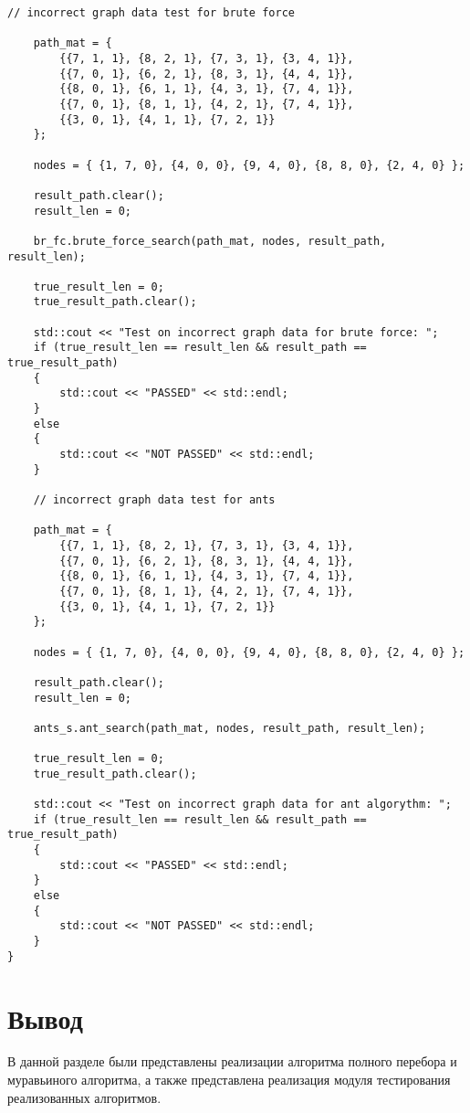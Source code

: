 \begin{lstlisting}[label=some-code-7,caption=Реализация тестов]
    // incorrect graph data test for brute force

    path_mat = {
        {{7, 1, 1}, {8, 2, 1}, {7, 3, 1}, {3, 4, 1}},
        {{7, 0, 1}, {6, 2, 1}, {8, 3, 1}, {4, 4, 1}},
        {{8, 0, 1}, {6, 1, 1}, {4, 3, 1}, {7, 4, 1}},
        {{7, 0, 1}, {8, 1, 1}, {4, 2, 1}, {7, 4, 1}},
        {{3, 0, 1}, {4, 1, 1}, {7, 2, 1}}
    };

    nodes = { {1, 7, 0}, {4, 0, 0}, {9, 4, 0}, {8, 8, 0}, {2, 4, 0} };

    result_path.clear();
    result_len = 0;

    br_fc.brute_force_search(path_mat, nodes, result_path, result_len);

    true_result_len = 0;
    true_result_path.clear();

    std::cout << "Test on incorrect graph data for brute force: ";
    if (true_result_len == result_len && result_path == true_result_path)
    {
        std::cout << "PASSED" << std::endl;
    }
    else
    {
        std::cout << "NOT PASSED" << std::endl;
    }

    // incorrect graph data test for ants

    path_mat = {
        {{7, 1, 1}, {8, 2, 1}, {7, 3, 1}, {3, 4, 1}},
        {{7, 0, 1}, {6, 2, 1}, {8, 3, 1}, {4, 4, 1}},
        {{8, 0, 1}, {6, 1, 1}, {4, 3, 1}, {7, 4, 1}},
        {{7, 0, 1}, {8, 1, 1}, {4, 2, 1}, {7, 4, 1}},
        {{3, 0, 1}, {4, 1, 1}, {7, 2, 1}}
    };

    nodes = { {1, 7, 0}, {4, 0, 0}, {9, 4, 0}, {8, 8, 0}, {2, 4, 0} };

    result_path.clear();
    result_len = 0;

    ants_s.ant_search(path_mat, nodes, result_path, result_len);

    true_result_len = 0;
    true_result_path.clear();

    std::cout << "Test on incorrect graph data for ant algorythm: ";
    if (true_result_len == result_len && result_path == true_result_path)
    {
        std::cout << "PASSED" << std::endl;
    }
    else
    {
        std::cout << "NOT PASSED" << std::endl;
    }
}
\end{lstlisting}

\section{Вывод}
В данной разделе были представлены реализации алгоритма полного перебора и муравьиного алгоритма, а также представлена реализация модуля тестирования реализованных алгоритмов.

